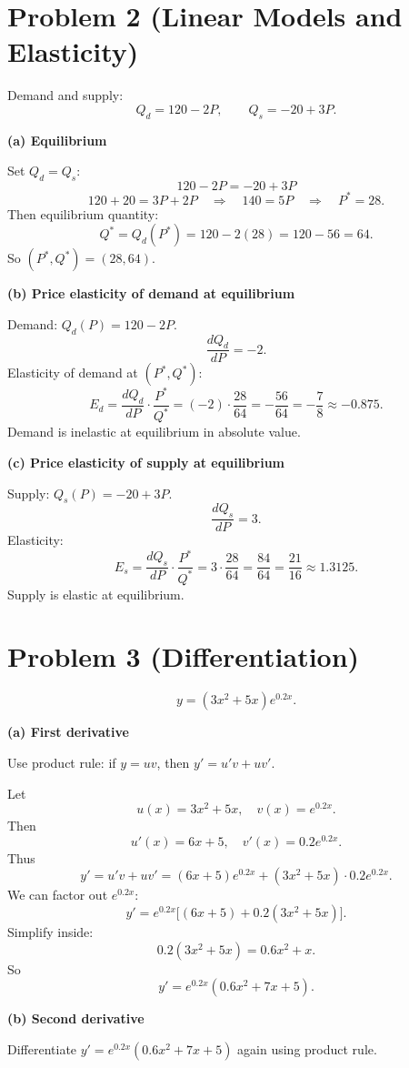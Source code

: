 \documentclass[12pt]{article}
\begin{document}
\section*{Problem 2 (Linear Models and Elasticity)}

Demand and supply:
\[
Q_d = 120 - 2P, \qquad Q_s = -20 + 3P.
\]

\textbf{(a) Equilibrium}

Set \(Q_d = Q_s\):
\[
120 - 2P = -20 + 3P
\]
\[
120 + 20 = 3P + 2P \quad \Rightarrow \quad 140 = 5P \quad \Rightarrow \quad P^\ast = 28.
\]
Then equilibrium quantity:
\[
Q^\ast = Q_d(P^\ast) = 120 - 2(28) = 120 - 56 = 64.
\]
So \((P^\ast, Q^\ast) = (28, 64)\).

\textbf{(b) Price elasticity of demand at equilibrium}

Demand: \(Q_d(P) = 120 - 2P\).
\[
\frac{dQ_d}{dP} = -2.
\]
Elasticity of demand at \((P^\ast,Q^\ast)\):
\[
E_d = \frac{dQ_d}{dP}\cdot \frac{P^\ast}{Q^\ast} = (-2)\cdot \frac{28}{64} = -\frac{56}{64} = -\frac{7}{8} \approx -0.875.
\]
Demand is inelastic at equilibrium in absolute value.

\textbf{(c) Price elasticity of supply at equilibrium}

Supply: \(Q_s(P) = -20 + 3P\).
\[
\frac{dQ_s}{dP} = 3.
\]
Elasticity:
\[
E_s = \frac{dQ_s}{dP}\cdot \frac{P^\ast}{Q^\ast} = 3\cdot \frac{28}{64} = \frac{84}{64} = \frac{21}{16} \approx 1.3125.
\]
Supply is elastic at equilibrium.



\section*{Problem 3 (Differentiation)}

\[
y = (3x^2 + 5x) e^{0.2x}.
\]

\textbf{(a) First derivative}

Use product rule: if \(y = u v\), then \(y' = u'v + uv'\).

Let
\[
u(x)=3x^2+5x, \quad v(x)=e^{0.2x}.
\]
Then
\[
u'(x)=6x+5, \quad v'(x)=0.2 e^{0.2x}.
\]
Thus
\[
y' = u'v + uv' = (6x+5)e^{0.2x} + (3x^2+5x)\cdot 0.2 e^{0.2x}.
\]
We can factor out \(e^{0.2x}\):
\[
y' = e^{0.2x}\big[(6x+5) + 0.2(3x^2+5x)\big].
\]
Simplify inside:
\[
0.2(3x^2+5x) = 0.6x^2 + x.
\]
So
\[
y' = e^{0.2x}(0.6x^2 + 7x + 5).
\]

\textbf{(b) Second derivative}

Differentiate \(y' = e^{0.2x}(0.6x^2 + 7x + 5)\) again using product rule.
\end{document}
